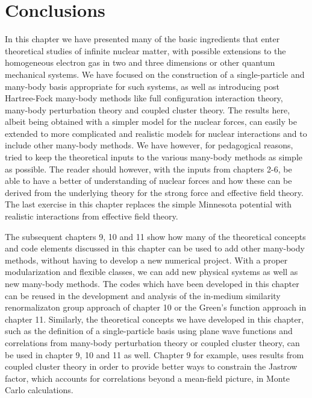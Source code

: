 \section{Conclusions}
In this chapter we have presented many of the basic ingredients that
enter theoretical studies of infinite nuclear matter, with possible
extensions to the homogeneous electron gas in two and three dimensions
or other quantum mechanical systems.  We have focused on the
construction of a single-particle and many-body basis appropriate for
such systems, as well as introducing post Hartree-Fock many-body
methods like full configuration interaction theory, many-body
perturbation theory and coupled cluster theory. The results here,
albeit being obtained with a simpler model for the nuclear forces, can
easily be extended to more complicated and realistic models for
nuclear interactions and to include other many-body methods. We have
however, for pedagogical reasons, tried to keep the theoretical inputs
to the various many-body methods as simple as possible. The reader
should however, with the inputs from chapters 2-6, be able to have a
better of understanding of nuclear forces and how these can be derived
from the underlying theory for the strong force and effective field
theory.  The last exercise in this chapter replaces the simple Minnesota potential with
realistic interactions from effective field theory. 



The subsequent chapters 9, 10 and 11 show how many of the theoretical
concepts and code elements discussed in this chapter can be used to
add other many-body methods, without having to develop a new numerical
project.  With a proper modularization and flexible classes, we can
add new physical systems as well as new many-body methods.  The codes
which have been developed in this chapter can be reused in the
development and analysis of the in-medium similarity renormalizaton
group approach of chapter 10 or the Green's function approach in chapter 11. Similarly, the theoretical concepts we
have developed in this chapter, such as the definition of a
single-particle basis using plane wave functions and correlations from
many-body perturbation theory or coupled cluster theory, can be used
in chapter 9, 10 and 11 as well. Chapter 9 for example, uses results
from coupled cluster theory in order to provide better ways to constrain
the Jastrow factor, which accounts for correlations beyond a mean-field picture, 
in Monte Carlo calculations.



